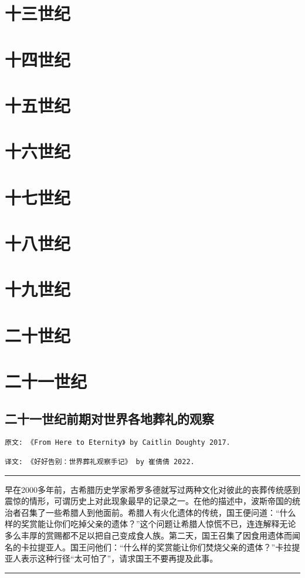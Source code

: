 \documentclass[12pt,oneside]{book}
\newcommand\hr{\par\noindent\hrule}
\begin{document}
\part{十三世纪}

\part{十四世纪}

\part{十五世纪}


\part{十六世纪}

\part{十七世纪}

\part{十八世纪}

\part{十九世纪}

\part{二十世纪}

\part{二十一世纪}
\chapter{二十一世纪前期对世界各地葬礼的观察}
\begin{verbatim}
原文: 《From Here to Eternity》 by Caitlin Doughty 2017. 

译文: 《好好告别：世界葬礼观察手记》 by 崔倩倩 2022.
\end{verbatim}


\hr
早在2000多年前，古希腊历史学家希罗多德就写过两种文化对彼此的丧葬传统感到震惊的情形，可谓历史上对此现象最早的记录之一。在他的描述中，波斯帝国的统治者召集了一些希腊人到他面前。希腊人有火化遗体的传统，国王便问道：“什么样的奖赏能让你们吃掉父亲的遗体？”这个问题让希腊人惊慌不已，连连解释无论多么丰厚的赏赐都不足以把自己变成食人族。第二天，国王召集了因食用遗体而闻名的卡拉提亚人。国王问他们：“什么样的奖赏能让你们焚烧父亲的遗体？”卡拉提亚人表示这种行径“太可怕了”，请求国王不要再提及此事。
\hr
\end{document}
